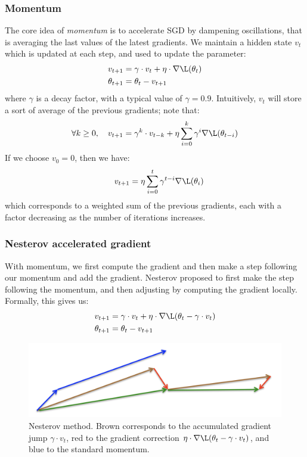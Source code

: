 \subsubsection{Momentum}
The core idea of \emph{momentum} is to accelerate SGD by dampening oscillations, that is averaging the last values of the latest gradients. We maintain a hidden state $v_t$ which is updated at each step, and used to update the parameter:
\begin{equation*}
    \begin{aligned}
        v_{t+1} &= \gamma\cdot v_t+\eta\cdot\nabla\L(\theta_t)\\
        \theta_{t+1} &= \theta_t - v_{t+1}
    \end{aligned}
\end{equation*}
where $\gamma$ is a decay factor, with a typical value of $\gamma=0.9$. Intuitively, $v_t$ will store a sort of average of the previous gradients; note that:
\begin{equation*}
    \forall k\geq 0, \quad v_{t+1} = \gamma^k\cdot v_{t-k} + \eta\sum_{i=0}^k \gamma^i \nabla\L(\theta_{t-i})
\end{equation*}
If we choose $v_0=0$, then we have:
\begin{equation*}
    \quad v_{t+1} = \eta\sum_{i=0}^t \gamma^{t-i} \nabla\L(\theta_i)
\end{equation*}
which corresponds to a weighted sum of the previous gradients, each with a factor decreasing as the number of iterations increases.

\subsubsection{Nesterov accelerated gradient}
With momentum, we first compute the gradient and then make a step following our momentum and add the gradient. Nesterov proposed to first make the step following the momentum, and then adjusting by computing the gradient locally. Formally, this gives us:
\begin{equation*}
    \begin{aligned}
        v_{t+1} &= \gamma\cdot v_t + \eta\cdot\nabla\L(\theta_t-\gamma\cdot v_t)\\
        \theta_{t+1} &= \theta_t - v_{t+1}
    \end{aligned}
\end{equation*}
\begin{figure}[H]
    \centering
    \includegraphics[width=.7\textwidth]{images/nesterov.png}
    \caption{Nesterov method. Brown corresponds to the accumulated gradient jump $\gamma\cdot v_t$, red to the gradient correction $\eta\cdot\nabla\L(\theta_t-\gamma\cdot v_t)$, and blue to the standard momentum.}
\end{figure}


